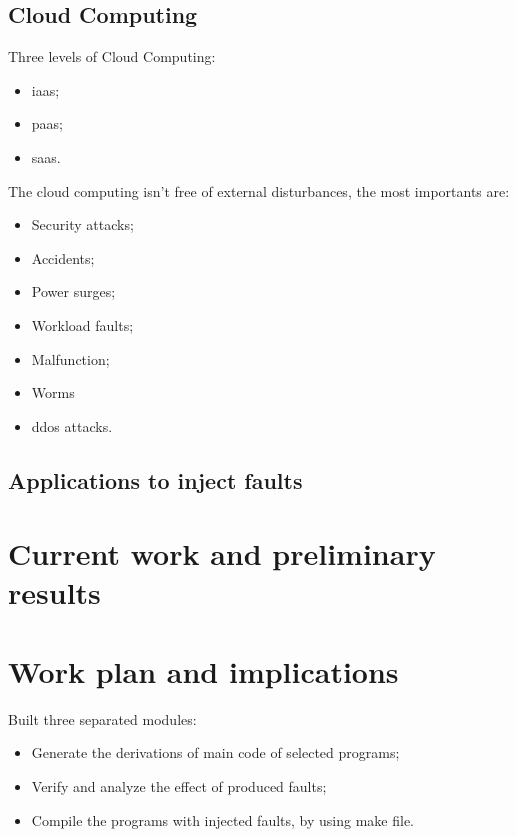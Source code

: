 \subsection{Cloud Computing}

Three levels of Cloud Computing:

\begin{itemize}
	\item \ac{iaas};
	\item \ac{paas};
	\item \ac{saas}.
\end{itemize}

The cloud computing isn't free of external disturbances\cite{wolter2012resilience}, the most importants are:
\begin{itemize}
 	\item Security attacks;
 	\item Accidents;
 	\item Power surges;
 	\item Workload faults;
 	\item Malfunction;
 	\item Worms
 	\item \ac{ddos} attacks.
 \end{itemize}

\subsection{Applications to inject faults}

\newpage
\section{Current work and preliminary results}

\newpage
\section{Work plan and implications}

Built three separated modules:

\begin{itemize}
	\item Generate the derivations of main code of selected programs;
	\item Verify and analyze the effect of produced faults;
	\item Compile the programs with injected faults, by using make file.
\end{itemize}

